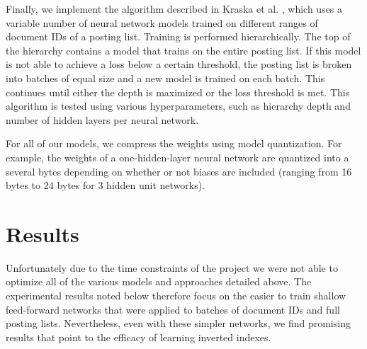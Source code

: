\documentclass{article}
\begin{document}
Finally, we implement the algorithm described in  Kraska et al. \cite{Kraska2018}, which uses a variable number of neural network models trained on different ranges of document IDs of a posting list. 
Training is performed hierarchically.
The top of the hierarchy contains a model that trains on the entire posting list.
If this model is not able to achieve a loss below a certain threshold, the posting list is broken into batches of equal size and a new model is trained on each batch.
This continues until either the depth is maximized or the loss threshold is met.
This algorithm is tested using various hyperparameters, such as hierarchy depth and number of hidden layers per neural network.

For all of our models, we compress the weights using model quantization.
For example, the weights of a one-hidden-layer neural network are quantized into a several bytes depending on whether or not biases are included (ranging from 16 bytes to 24 bytes for 3 hidden unit networks).

\section{Results}\label{sec:results}
Unfortunately due to the time constraints of the project we were not able to optimize all of the various  models and approaches detailed above.
The experimental results noted below therefore focus on the easier to train shallow feed-forward networks that were applied to batches of document IDs and full posting lists.
Nevertheless, even with these simpler networks, we find promising results that point to the efficacy of learning inverted indexes.
\end{document}
